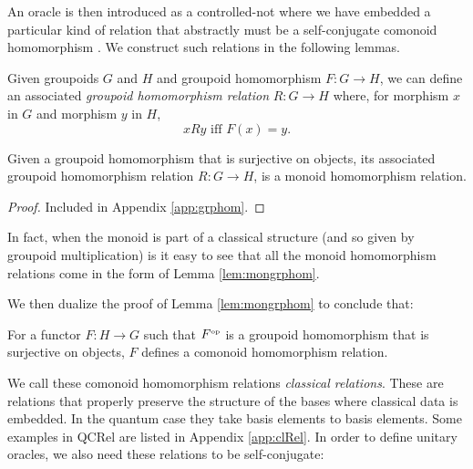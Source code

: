 An oracle is then introduced as a controlled-not where we have embedded a particular kind of relation that abstractly must be a self-conjugate comonoid homomorphism \cite{zeng-unitary}. We construct such relations in the following lemmas.

\begin{defn}
Given groupoids $G$ and $H$ and groupoid homomorphism $F:G\to H$, we can define an associated \emph{groupoid homomorphism relation} $R:G\to H$ where, for morphism $x$ in $G$ and morphism $y$ in $H$,
$$
xRy \mbox{ iff }F(x) = y.
$$
\end{defn}

\begin{lemma}
\label{lem:mongrphom}
Given a groupoid homomorphism that is surjective on objects, its associated groupoid homomorphism relation $R:G\to H$, is a monoid homomorphism relation.
\end{lemma}
\begin{proof}
Included in Appendix \ref{app:grphom}.
\end{proof}

\noindent In fact, when the monoid is part of a classical structure (and so given by groupoid multiplication) is it easy to see that all the monoid homomorphism relations come in the form of Lemma \ref{lem:mongrphom}.

We then dualize the proof of Lemma \ref{lem:mongrphom} to conclude that:
\begin{lemma}
\label{lem:classicalRelation}
For a functor $F:H\to G$ such that $F^{\mbox{\tiny op}}$ is a groupoid homomorphism that is surjective on objects, $F$ defines a comonoid homomorphism relation.
\end{lemma}
\noindent We call these comonoid homomorphism relations \emph{classical relations}. These are relations that properly preserve the structure of the bases where classical data is embedded.  In the quantum case they take basis elements to basis elements. Some examples in QCRel are listed in Appendix \ref{app:clRel}. In order to define unitary oracles, we also need these relations to be self-conjugate:

